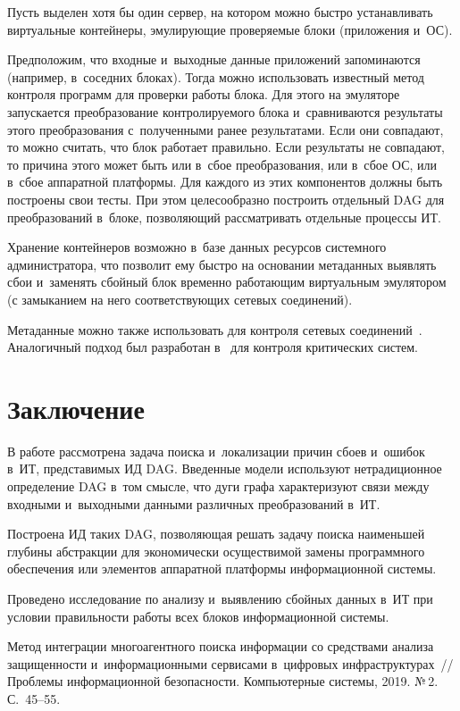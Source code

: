 \begin{multicols}{2}
Пусть выделен хотя бы один сервер, на котором 
можно быстро устанавливать виртуальные контейнеры, эмулирующие 
проверяемые блоки (приложения и~ОС). 
  
  Предположим, что входные и~выходные данные приложений запоминаются 
(например, в~соседних блоках). Тогда можно использовать известный метод 
контроля программ для проверки работы блока. Для этого на эмуляторе 
запускается преобразование контролируемого блока и~сравниваются результаты 
этого преобразования с~полученными ранее результатами. Если они совпадают, то 
можно считать, что блок работает правильно. Если результаты не совпадают, то 
причина этого может быть или в~сбое преобразования, или в~сбое ОС, или 
в~сбое аппаратной платформы. Для каждого из этих компонентов должны быть 
построены свои тесты. При этом целесообразно построить отдельный DAG для 
преобразований в~блоке, позволяющий рассматривать отдельные процессы ИТ. 
  
  Хранение контейнеров возможно в~базе данных ресурсов системного 
администратора, что позволит ему быстро на основании метаданных выявлять 
сбои и~заменять сбойный блок временно работающим виртуальным эмулятором 
(с замыканием на него соответствующих сетевых соединений). 
  
  Метаданные можно также использовать для контроля сетевых 
соединений~\cite{5-gr}. Аналогичный подход был разработан в~\cite{11-gr} для 
контроля критических систем. 
  
  \section{Заключение}
   
   В работе рассмотрена задача поиска и~локализации причин сбоев и~ошибок 
в~ИТ, представимых ИД DAG. Введенные модели 
используют нетрадиционное определение DAG в~том смысле, что дуги графа 
характеризуют связи между входными и~выходными данными различных 
преобразований в~ИТ. 
   
   Построена ИД таких DAG, позволяющая решать 
задачу поиска наименьшей глубины абстракции для экономически осуществимой 
замены программного обеспечения или элементов аппаратной платформы 
информационной системы. 
   
   Проведено исследование по анализу и~выявлению сбойных данных в~ИТ при 
условии пра\-виль\-ности работы всех блоков информационной системы. 
   
{\small\frenchspacing
 {%
 \begin{thebibliography}{99}
 Метод интеграции многоагентного поиска информации со средствами анализа 
за\-щи\-щен\-ности и~информационными сервисами в~цифровых инфраструктурах~// Проблемы 
информационной безопас\-ности. Компьютерные системы, 2019. №\,2. С.~45--55. 


\end{thebibliography}}}
\end{multicols}

